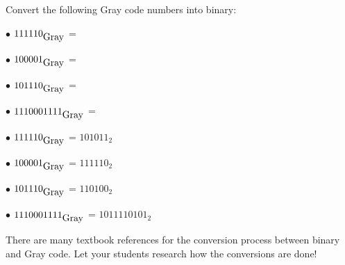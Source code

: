 

Convert the following Gray code numbers into binary:

\medskip
\item{$\bullet$} $111110_{\hbox{Gray}}$ =
\vskip 5pt
\item{$\bullet$} $100001_{\hbox{Gray}}$ = 
\vskip 5pt
\item{$\bullet$} $101110_{\hbox{Gray}}$ = 
\vskip 5pt
\item{$\bullet$} $1110001111_{\hbox{Gray}}$ = 
\medskip







\medskip
\item{$\bullet$} $111110_{\hbox{Gray}}$ = $101011_2$
\vskip 5pt
\item{$\bullet$} $100001_{\hbox{Gray}}$ = $111110_2$
\vskip 5pt
\item{$\bullet$} $101110_{\hbox{Gray}}$ = $110100_2$
\vskip 5pt
\item{$\bullet$} $1110001111_{\hbox{Gray}}$ = $1011110101_2$
\medskip







There are many textbook references for the conversion process between binary and Gray code.  Let your students research how the conversions are done!



